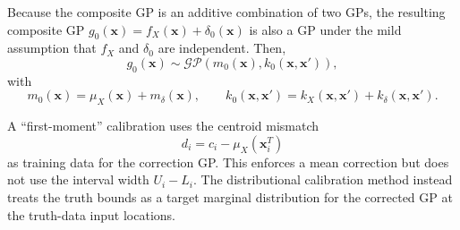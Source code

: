 \documentclass[journal]{new-aiaa}
\newcommand{\x}{\mathbf{x}}
\begin{document}
Because the composite GP is an additive combination of two GPs, the resulting composite GP
$g_0(\x) = f_X(\x) + \delta_0(\x)$ is also a GP under the mild assumption that
$f_X$ and $\delta_0$ are independent. Then,
\begin{equation*}
    g_0(\x)
    \sim
    \mathcal{GP}
    \left(
    m_0(\x),
    k_0(\x,\x')
    \right),
\end{equation*}
with
\begin{equation*}
    m_0(\x)
    =
    \mu_X(\x)
    +
    m_\delta(\x),
    \qquad
    k_0(\x,\x')
    =
    k_X(\x,\x')
    +
    k_\delta(\x,\x').
\end{equation*}
%


A ``first-moment'' calibration uses the centroid mismatch
\begin{equation*}
    d_i
    =
    c_i
    -
    \mu_X(\x_i^T)
\end{equation*}
as training data for the correction GP.  This enforces a mean correction but
does not use the interval width $U_i-L_i$.  The distributional calibration
method instead treats the truth bounds as a target marginal distribution for the
corrected GP at the truth-data input locations.
\end{document}
